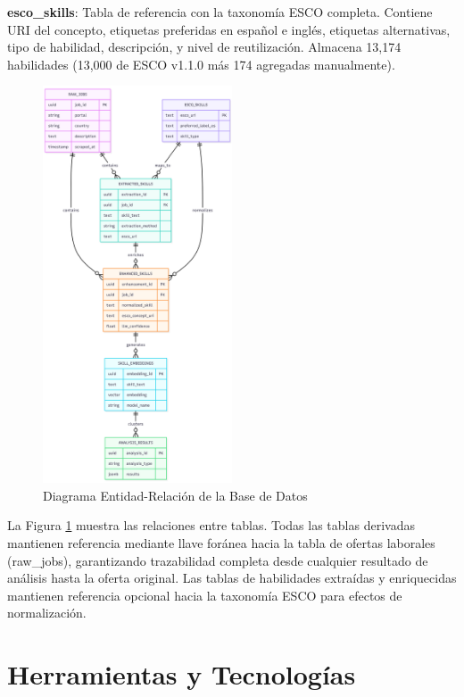\textbf{esco\_skills}: Tabla de referencia con la taxonomía ESCO completa. Contiene URI del concepto, etiquetas preferidas en español e inglés, etiquetas alternativas, tipo de habilidad, descripción, y nivel de reutilización. Almacena 13,174 habilidades (13,000 de ESCO v1.1.0 más 174 agregadas manualmente).

\begin{figure}[H]
\centering
\includegraphics[width=0.5\textwidth]{diagrams/DiagramaER.png}
\caption{Diagrama Entidad-Relación de la Base de Datos}
\label{fig:diagrama-er}
\end{figure}

La Figura \ref{fig:diagrama-er} muestra las relaciones entre tablas. Todas las tablas derivadas mantienen referencia mediante llave foránea hacia la tabla de ofertas laborales (raw\_jobs), garantizando trazabilidad completa desde cualquier resultado de análisis hasta la oferta original. Las tablas de habilidades extraídas y enriquecidas mantienen referencia opcional hacia la taxonomía ESCO para efectos de normalización.

\section{Herramientas y Tecnologías}

